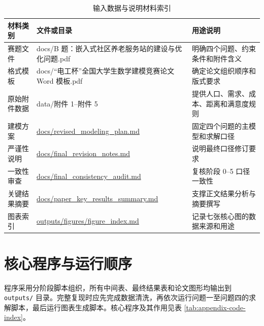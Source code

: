 \begin{table}[H]
  \centering
  \caption{输入数据与说明材料索引}
  \label{tab:appendix-input-index}
  \small
  \renewcommand{\arraystretch}{1.18}
  \begin{tabular}{p{}p{}p{}}
    \toprule
    材料类别 & 文件或目录 & 用途说明 \\
    \midrule
    赛题文件 & docs/B 题：嵌入式社区养老服务站的建设与优化问题.pdf & 明确四个问题、约束条件和附件含义 \\
    格式模板 & docs/“电工杯”全国大学生数学建模竞赛论文 Word 模板.pdf & 确定论文组织顺序和版式要求 \\
    原始附件数据 & data/附件 1--附件 5 & 提供人口、需求、成本、距离和满意度规则 \\
    建模方案 & \url{docs/revised_modeling_plan.md} & 固定四个问题的主模型和求解口径 \\
    严谨性说明 & \url{docs/final_revision_notes.md} & 说明最终口径修订要求 \\
    一致性审查 & \url{docs/final_consistency_audit.md} & 复核阶段 0--5 口径一致性 \\
    关键结果摘要 & \url{docs/paper_key_results_summary.md} & 支撑正文结果分析与摘要撰写 \\
    图表索引 & \url{outputs/figures/figure_index.md} & 记录七张核心图的数据来源和用途 \\
    \bottomrule
  \end{tabular}
\end{table}

\section{核心程序与运行顺序}

程序采用分阶段脚本组织，所有中间表、最终结果表和论文图形均输出到 \texttt{outputs/} 目录。完整复现时应先完成数据清洗，再依次运行问题一至问题四的求解脚本，最后运行图表生成脚本。核心程序及其作用见表 \ref{tab:appendix-code-index}。

